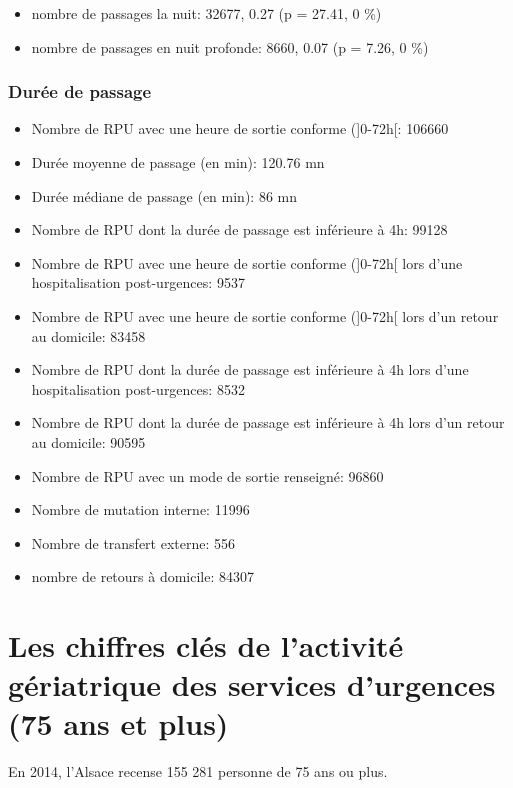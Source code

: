 \documentclass[]{article}
\begin{document}
\begin{itemize}
\itemsep1pt\parskip0pt
\item
  nombre de passages la nuit: 32677, 0.27 (p = 27.41, 0 \%)
\item
  nombre de passages en nuit profonde: 8660, 0.07 (p = 7.26, 0 \%)
\end{itemize}

\subsubsection{Durée de passage}\label{duree-de-passage}

\begin{itemize}
\item
  Nombre de RPU avec une heure de sortie conforme ({]}0-72h{[}: 106660
\item
  Durée moyenne de passage (en min): 120.76 mn
\item
  Durée médiane de passage (en min): 86 mn
\item
  Nombre de RPU dont la durée de passage est inférieure à 4h: 99128
\item
  Nombre de RPU avec une heure de sortie conforme ({]}0-72h{[} lors
  d'une hospitalisation post-urgences: 9537
\item
  Nombre de RPU avec une heure de sortie conforme ({]}0-72h{[} lors d'un
  retour au domicile: 83458
\item
  Nombre de RPU dont la durée de passage est inférieure à 4h lors d'une
  hospitalisation post-urgences: 8532
\item
  Nombre de RPU dont la durée de passage est inférieure à 4h lors d'un
  retour au domicile: 90595
\item
  Nombre de RPU avec un mode de sortie renseigné: 96860
\item
  Nombre de mutation interne: 11996
\item
  Nombre de transfert externe: 556
\item
  nombre de retours à domicile: 84307
\end{itemize}

\section{Les chiffres clés de l'activité gériatrique des services
d'urgences (75 ans et
plus)}\label{les-chiffres-cles-de-lactivite-geriatrique-des-services-durgences-75-ans-et-plus}

En 2014, l'Alsace recense 155 281 personne de 75 ans ou plus.
\end{document}
